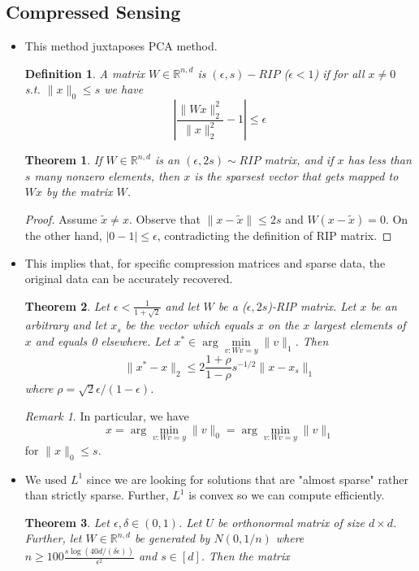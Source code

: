 \documentclass[11pt,reqno]{amsart}
\newtheorem{theorem}{Theorem}
\newtheorem{definition}{Definition}
\theoremstyle{remark}
\newtheorem{remark}[example]{Remark}
\begin{document}
\subsection*{Compressed Sensing}
\begin{itemize}
\item This method juxtaposes PCA method.
\begin{definition}
A matrix $W\in \mathbb{R}^{n,d}$ is $(\epsilon, s)-RIP$ ($\epsilon<1$) if for all $x\neq 0$ s.t. $\lVert x\rVert_0\leq s$
 we have 
 \[
|\frac{\lVert Wx\rVert^2_2}{\lVert x\rVert^2_2}-1|\leq \epsilon
 \]
\end{definition}
\begin{theorem}
If $W\in\mathbb{R}^{n,d}$ is an $(\epsilon, 2s)\sim RIP$ matrix, 
and if $x$ has less than $s$ many nonzero elements, then $x$ is the sparsest vector that
 gets mapped to $Wx$ by the matrix $W$.
\end{theorem}
\begin{proof}
Assume $\tilde x\neq x$. Observe that 
$\lVert x-\tilde x\rVert\leq 2s$ and $W(x-\tilde x)=0$. 
On the other hand, $\lvert 0-1\rvert\leq \epsilon$, contradicting 
the definition of RIP matrix.
\end{proof}
\item This implies that, for specific compression matrices and sparse data, the original data 
can be accurately recovered.
\begin{theorem}
Let $\epsilon<\frac 1{1+\sqrt{2}}$ and let $W$ be a ($\epsilon, 2s$)-RIP matrix. Let
 $x$ be an arbitrary and let $x_s$ be the vector which equals $x$ on the $x$ largest
  elements of $x$ and equals 0 elsewhere. Let $x^*\in \arg\min\limits_{v:Wv=y}\lVert
    v\rVert_1$. Then
\[
\lVert x^*-x\rVert_2\leq 2\frac{1+\rho}{1-\rho}s^{-1/2}\lVert x-x_s\rVert_1
\]
where $\rho=\sqrt{2}\epsilon/(1-\epsilon)$.
\end{theorem}
\begin{remark}
In particular, we have 
\[
x=\arg\min\limits_{v:Wv=y}\lVert
v\rVert_0=\arg\min\limits_{v:Wv=y}\lVert v\rVert_1
\]
for $\lVert x\rVert_0\leq s$.
\end{remark}
\item We used $L^1$ since we are looking for
solutions that are "almost sparse" rather than strictly sparse. Further, 
$L^1$ is convex so we can compute efficiently.
\begin{theorem}
Let $\epsilon, \delta\in(0,1)$.
Let $U$ be orthonormal matrix of size $d\times d$. Further, 
let $W\in\mathbb{R}^{n,d}$ be generated by $N(0,1/n)$ where 
$n\geq 100\frac{s\log(40d/(\delta\epsilon))}{\epsilon^2}$ and $s\in [d]$. Then the matrix

\end{theorem}
\end{itemize}
\end{document}
